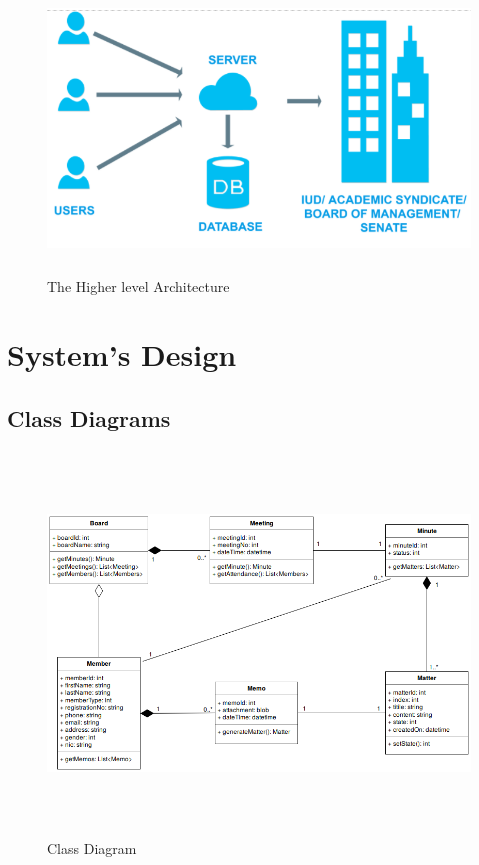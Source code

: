 \documentclass[a4paper,beamer]{article}
\begin{document}
	\newpage
	\begin{figure}[h]
		\begin{center}
			\includegraphics[width=5in,height=3in]{img/higher-level-architecture}
		\end{center}
		\caption{The Higher level Architecture}
		\label{fig:architecture}
	\end{figure}
	
	\newpage
	
	\section{System's Design}
	
	\subsection{Class Diagrams}
		\vspace{1cm}
		\begin{figure}[h!]
			\begin{center}
			\includegraphics[width=6in,height=4in]{img/class-diagram}
			\end{center}
			\caption{Class Diagram}
			\label{fig:class-diagram}
		\end{figure}
		\newpage
	
\end{document}
